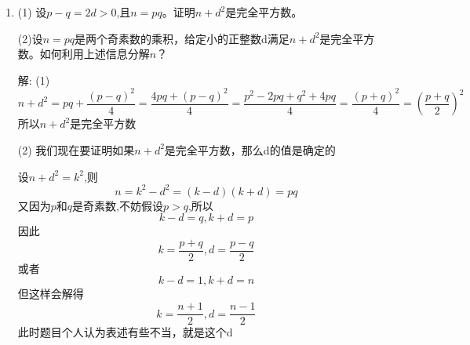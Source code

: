 \documentclass[12pt,a4paper]{article}
\begin{document}
\begin{enumerate}
\subsection*{4096 bit 合数测试}

\begin{lstlisting}[style=numstyle]
8855600210937835133056877034991371019895213310999185081313262064695699713347119617727345824034435219
5237399496190900714703159592551210478309964746553613846609974132348224251252669992352890801541020911
7916226992307227088335739642680503922310744546364390712646981791745874518417723448947338724762120818
9347412582605496030486060580164076469369973057009862590295373608381151956443442437852808029943204748
7421680826816290632371262368388785199429161509091932329457882940726884290072810848575124983992319516
8181352324088519535334893513928184077120873045684059217903877339054187281073505159282962477364527041
3880216164817563752953716073347843883277803313311560418899249015138006634873036546191538327552196846
2229314273066642733371557297733793239053291353544305696096645527537673269463859702041726865241978137
7250850928245199412431609772843183094245459258827818182589540875051121860232978328331765460325896439
4954644975248918016362053642344040636751372372012921259960800961367312764251317891527163578179603083
7330136813456205072329907643613035580377165753191552854491015679969714721971078614240603990121161635
2720360994245146930618182771540742183458991045391758790874519387681228591429699101837476787074993470
617508116790215823910398568586434
\end{lstlisting}

\noindent 判定结果：合数；耗时：$17\,\mathrm{ms}$。
\item (1) 设\(p-q=2d>0\),且\(n=pq\)。证明\(n+d^2\)是完全平方数。

(2)设\(n=pq\)是两个奇素数的乘积，给定小的正整数d满足\(n+d^2\)是完全平方数。如何利用上述信息分解\(n\)？

解:
(1)
\[
n+d^2 = pq + \frac{(p-q)^2}{4}=\frac{4pq+(p-q)^2}{4} = \frac{p^2-2pq+q^2+4pq}{4} = \frac{(p+q)^2}{4} = \left(\frac{p+q}{2}\right)^2
\]
所以\(n+d^2\)是完全平方数

(2)
我们现在要证明如果\(n+d^2\)是完全平方数，那么d的值是确定的

设\(n+d^2 = k^2\),则
\[
n = k^2 - d^2 = (k-d)(k+d) = pq
\]
又因为\(p\)和\(q\)是奇素数,不妨假设\(p>q\),所以
\[k-d = q, k+d = p
\]
因此
\[
    k = \frac{p+q}{2}, d = \frac{p-q}{2}
\]
或者
\[
k-d = 1, k+d = n
\]
但这样会解得
\[
k = \frac{n+1}{2}, d = \frac{n-1}{2}
\]
此时题目个人认为表述有些不当，就是这个d


\end{enumerate}
\end{document}
